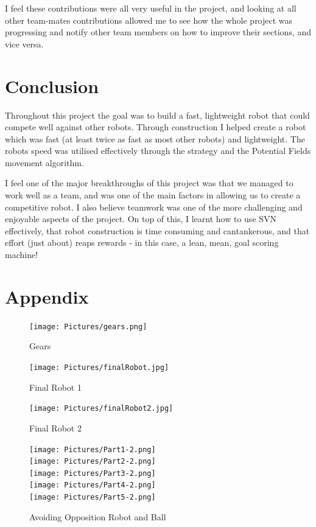 \documentclass[12pt]{IEEEtran}
\begin{document}
I feel these contributions were all very useful in the project, and looking at all other team-mates contributions allowed me to see how the whole project was progressing and notify other team members on how to improve their sections, and vice versa.

\section{Conclusion}
Throughout this project the goal was to build a fast, lightweight robot that could compete well against other robots. Through construction I helped create a robot which was fast (at least twice as fast as most other robots) and lightweight. The robots speed was utilised effectively through the strategy and the Potential Fields movement algorithm. \linebreak

I feel one of the major breakthroughs of this project was that we managed to work well as a team, and was one of the main factors in allowing us to create a competitive robot. I also believe teamwork was one of the more challenging and enjoyable aspects of the project. On top of this, I learnt how to use SVN effectively, that robot construction is time consuming and cantankerous, and that effort (just about) reaps rewards - in this case, a lean, mean, goal scoring machine!


\newpage

\section{Appendix}

\begin{center}

\begin{figure}[htp]
\texttt{[image: Pictures/gears.png]}
\caption{Gears}
\end{figure}

\begin{figure}[htp]
\texttt{[image: Pictures/finalRobot.jpg]}
\caption{Final Robot 1}
\end{figure}

\begin{figure}[htp]
\texttt{[image: Pictures/finalRobot2.jpg]}
\caption{Final Robot 2}
\end{figure}

\begin{figure}[htp]
\texttt{[image: Pictures/Part1-2.png]}\\
\texttt{[image: Pictures/Part2-2.png]}\\
\texttt{[image: Pictures/Part3-2.png]}\\
\texttt{[image: Pictures/Part4-2.png]}\\
\texttt{[image: Pictures/Part5-2.png]}\\
\label{fig:Avoiding Obstacles}
\caption{Avoiding Opposition Robot and Ball}
\end{figure}

\end{center}
\end{document}
